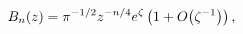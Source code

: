 \[\mathop{B_{n}\/}\nolimits\!\left(z\right)={\pi}^{-1/2}z^{-n/4}e^{\zeta}\left(1%
+\mathop{O\/}\nolimits\!\left(\zeta^{-1}\right)\right),\]